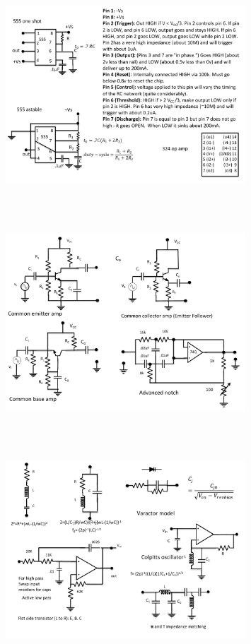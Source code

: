 \begin{figure} 
\center
\includegraphics[width=0.8\textwidth,natwidth=642,natheight=610, height=80mm, width=88mm]{circuit3.pdf}
\end{figure}
\begin{figure} 
\center
\includegraphics[width=0.8\textwidth,natwidth=642,natheight=610, height=80mm, width=88mm]{circuit4.pdf}
\end{figure}
\begin{figure} 
\center
\includegraphics[width=0.8\textwidth,natwidth=642,natheight=610, height=80mm, width=88mm]{circuit5.pdf}
\end{figure}
